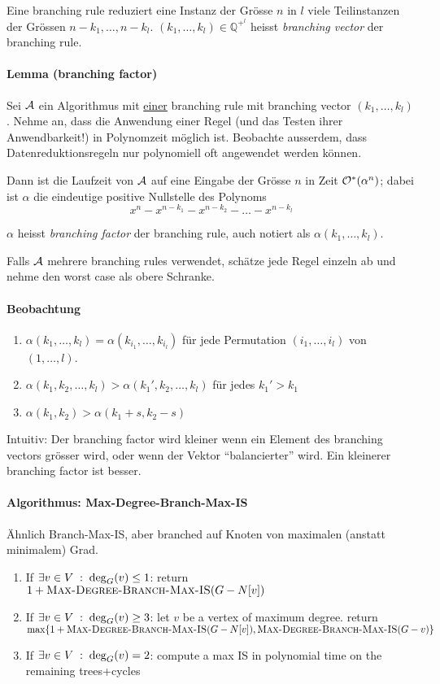 Eine branching rule reduziert eine Instanz der Grösse $n$ in $l$ viele Teilinstanzen der Grössen $n-k_1, \dots, n-k_l$.
$(k_1, \dots, k_l) \in \mathbb{Q}^{+^l}$ heisst \emph{branching vector} der branching rule.

\paragraph{Lemma (branching factor)}
Sei $\mathcal{A}$ ein Algorithmus mit \underline{einer} branching rule mit branching vector $(k_1, \dots, k_l)$.
Nehme an, dass die Anwendung einer Regel (und das Testen ihrer Anwendbarkeit!) in Polynomzeit möglich ist.
Beobachte ausserdem, dass Datenreduktionsregeln nur polynomiell oft angewendet werden können.

Dann ist die Laufzeit von $\mathcal{A}$ auf eine Eingabe der Grösse $n$ in Zeit $\mathcal{O}^*(\alpha^n)$;
dabei ist $\alpha$ die eindeutige positive Nullstelle des Polynoms
$$ x^n - x^{n-k_1} - x^{n-k_2} - \dots - x^{n-k_l} $$

$\alpha$ heisst \emph{branching factor} der branching rule, auch notiert als $\alpha(k_1, \dots, k_l)$.

Falls $\mathcal{A}$ mehrere branching rules verwendet, schätze jede Regel einzeln ab und nehme den worst case als obere Schranke.

\paragraph{Beobachtung}
\begin{enumerate}[label=(\alph*)]
    \item $ \alpha(k_1, \dots, k_l) = \alpha(k_{i_1}, \dots, k_{i_l}) $ für jede Permutation $(i_1, \dots, i_l)$
    von $(1, \dots, l)$.
    \item $ \alpha(k_1, k_2, \dots, k_l) > \alpha(k_1', k_2, \dots, k_l)$ für jedes $k_1' > k_1$
    \item $ \alpha(k_1, k_2) > \alpha(k_1+s, k_2-s)$
\end{enumerate}
Intuitiv: Der branching factor wird kleiner wenn ein Element des branching vectors grösser wird,
oder wenn der Vektor ``balancierter'' wird.
Ein kleinerer branching factor ist besser.

\paragraph{Algorithmus: Max-Degree-Branch-Max-IS}
Ähnlich Branch-Max-IS, aber branched auf Knoten von maximalen (anstatt minimalem) Grad.
{
\newcommand{\algo}{\textsc{Max-Degree-Branch-Max-IS}}
\begin{enumerate}
    \item If $\exists v \in V \; : \; \deg_G(v) \leq 1$: return $ 1+ \algo(G-N[v]) $
    \item If $\exists v \in V \; : \; \deg_G(v) \geq 3$: let $v$ be a vertex of maximum degree. return \\
    $ \max \{ 1 + \algo(G-N[v]), \algo(G-v) \} $
    \item If $\exists v \in V \; : \; \deg_G(v) = 2$: compute a max IS in polynomial time on the remaining trees+cycles
\end{enumerate}
}

